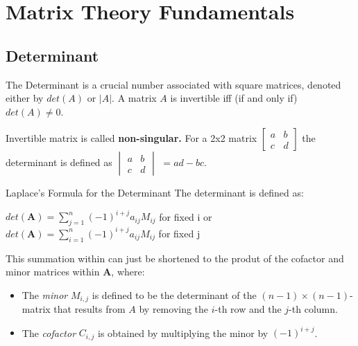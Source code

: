 \chapter{Matrix Theory Fundamentals}
\section{Determinant}

\noindent
The Determinant is a crucial number associated with square matrices, denoted either by $det(A)$ or $|A|$. A matrix $A$ is invertible iff (if and only if) $det(A) \neq 0$.

\noindent
Invertible matrix is called \textbf{non-singular.}
For a 2x2 matrix 
$
\begin{bmatrix}
a&b\\c&d
\end{bmatrix} $
the determinant is defined as 
$\begin{vmatrix}
a&b\\c&d
\end{vmatrix}$ $= ad-bc$.

\noindent

\begin{definitionbox}{Laplace's Formula for the Determinant} 
The determinant is defined as:

$det(\textbf{A}) = \sum^n_{j=1}(-1)^{i+j} a_{ij}M_{ij} $ for fixed i or \\
\noindent
$det(\textbf{A}) = \sum^n_{i=1}(-1)^{i+j} a_{ij}M_{ij} $ for fixed j 

This summation within can just be shortened to the produt of the cofactor and minor matrices within \textbf{A}, where:

\begin{itemize}
    \item The \emph{minor} \( M_{i,j} \) is defined to be the determinant of the \( (n - 1) \times (n - 1) \)-matrix that results from \( A \) by removing the \( i \)-th row and the \( j \)-th column.
    \item The \emph{cofactor} \( C_{i,j} \) is obtained by multiplying the minor by \( (-1)^{i+j} \).
\end{itemize}
\end{definitionbox}

